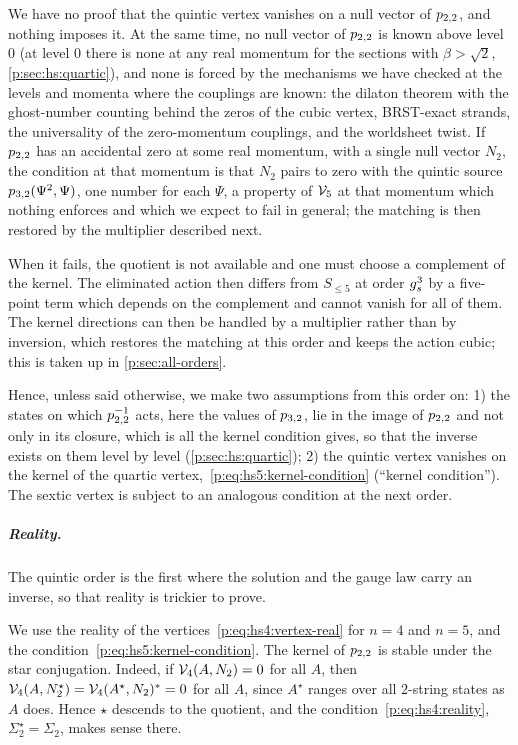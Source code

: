 We have no proof that the quintic vertex vanishes on a null vector of $p_{2,2}$, and nothing imposes it.
  At the same time, no null vector of $p_{2,2}$ is known above level $0$ (at level $0$ there is none at any real momentum for the sections with $\beta > \sqrt{2}$, \cref{p:sec:hs:quartic}), and none is forced by the mechanisms we have checked at the levels and momenta where the couplings are known: the dilaton theorem with the ghost-number counting behind the zeros of the cubic vertex, BRST-exact strands, the universality of the zero-momentum couplings, and the worldsheet twist.
  If $p_{2,2}$ has an accidental zero at some real momentum, with a single null vector $N_2$, the condition at that momentum is that $N_2$ pairs to zero with the quintic source $p_{3,2}(\Psi^2, \Psi)$, one number for each $\Psi$, a property of $\mathcal{V}_{5}$ at that momentum which nothing enforces and which we expect to fail in general; the matching is then restored by the multiplier described next.

When it fails, the quotient is not available and one must choose a complement of the kernel.
The eliminated action then differs from $S_{\le 5}$ at order $g_s^3$ by a five-point term which depends on the complement and cannot vanish for all of them.
The kernel directions can then be handled by a multiplier rather than by inversion, which restores the matching at this order and keeps the action cubic; this is taken up in \cref{p:sec:all-orders}.

Hence, unless said otherwise, we make two assumptions from this order on: 1) the states on which $p_{2,2}^{-1}$ acts, here the values of $p_{3,2}$, lie in the image of $p_{2,2}$ and not only in its closure, which is all the kernel condition gives, so that the inverse exists on them level by level (\cref{p:sec:hs:quartic}); 2) the quintic vertex vanishes on the kernel of the quartic vertex,~\eqref{p:eq:hs5:kernel-condition} (``kernel condition'').
The sextic vertex is subject to an analogous condition at the next order.


\subparagraph{Reality.}

The quintic order is the first where the solution and the gauge law carry an inverse, so that reality is trickier to prove.

We use the reality of the vertices~\eqref{p:eq:hs4:vertex-real} for $n = 4$ and $n = 5$, and the condition~\eqref{p:eq:hs5:kernel-condition}.
  The kernel of $p_{2,2}$ is stable under the star conjugation.
  Indeed, if $\mathcal{V}_{4}(A, N_2) = 0$ for all $A$, then $\mathcal{V}_{4}(A, N_2^\star) = \mathcal{V}_{4}(A^\star, N_2)^* = 0$ for all $A$, since $A^\star$ ranges over all $2$-string states as $A$ does.
  Hence $\star$ descends to the quotient, and the condition~\eqref{p:eq:hs4:reality}, $\Sigma_2^\star = \Sigma_2$, makes sense there.

